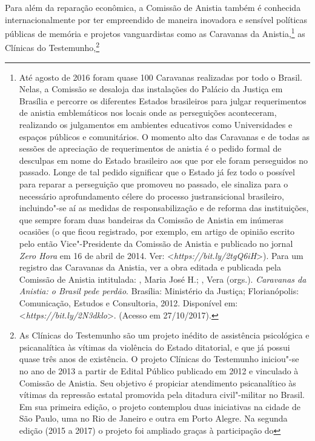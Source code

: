 Para além da reparação econômica, a Comissão de Anistia também é
conhecida internacionalmente por ter empreendido de maneira inovadora e
sensível políticas públicas de memória e projetos vanguardistas como as
Caravanas da Anistia,\footnote{Até agosto de 2016 foram quase 100
  Caravanas realizadas por todo o Brasil. Nelas, a Comissão se desaloja
  das instalações do Palácio da Justiça em Brasília e percorre os
  diferentes Estados brasileiros para julgar requerimentos de anistia
  emblemáticos nos locais onde as perseguições aconteceram, realizando
  os julgamentos em ambientes educativos como Universidades e espaços
  públicos e comunitários. O momento alto das Caravanas e de todas as
  sessões de apreciação de requerimentos de anistia é o pedido formal de
  desculpas em nome do Estado brasileiro aos que por ele foram
  perseguidos no passado. Longe de tal pedido significar que o Estado já
  fez todo o possível para reparar a perseguição que promoveu no
  passado, ele sinaliza para o necessário aprofundamento célere do
  processo justransicional brasileiro, incluindo"-se aí as medidas de
  responsabilização e de reforma das instituições, que sempre foram duas
  bandeiras da Comissão de Anistia em inúmeras ocasiões (o que ficou
  registrado, por exemplo, em artigo de opinião escrito pelo então
  Vice"-Presidente da Comissão de Anistia e publicado no jornal \emph{Zero Hora}
  em 16 de abril de 2014. Ver:
  \textless{}\emph{https://bit.ly/2tgQ6iH}\textgreater{}). Para um registro das
  Caravanas da Anistia, ver a obra editada e publicada pela Comissão de
  Anistia intitulada: , Maria José H.; , Vera (orgs.).
  \emph{Caravanas da Anistia: o Brasil pede perdão}. Brasília:
  Ministério da Justiça; Florianópolis: Comunicação, Estudos e
  Consultoria, 2012. Disponível em:
  \textless{}\emph{https://bit.ly/2N3dklo}\textgreater{}.
  (Acesso em 27/10/2017).} as Clínicas do Testemunho,\footnote{As
  Clínicas do Testemunho são um projeto inédito de assistência
  psicológica e psicanalítica às vítimas da violência do Estado
  ditatorial, e que já possui quase três anos de existência. O projeto
  Clínicas do Testemunho iniciou"-se no ano de 2013 a partir de Edital
  Público publicado em 2012 e vinculado à Comissão de Anistia. Seu
  objetivo é propiciar atendimento psicanalítico às vítimas da repressão
  estatal promovida pela ditadura civil"-militar no Brasil. Em sua
  primeira edição, o projeto contemplou duas iniciativas na cidade de São
  Paulo, uma no Rio de Janeiro e outra em Porto Alegre. Na segunda
  edição (2015 a 2017) o projeto foi ampliado graças à participação do
}
